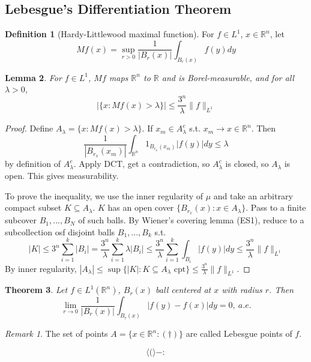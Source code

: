 \documentclass{article}
\theoremstyle{definition}
\newtheorem{defn}{Definition}[section]
\theoremstyle{remark}
\newtheorem{rem}{Remark}
\theoremstyle{plain}
\newtheorem{lem}[defn]{Lemma}
\newtheorem{thm}[defn]{Theorem}
\newcommand{\RR}{\mathbb{R}}
\begin{document}
\subsection{Lebesgue's Differentiation Theorem}
\begin{defn}[Hardy-Littlewood maximal function]
    For $f\in L^1$, $x\in\RR^n$, let $$Mf(x)=\sup_{r>0}\dfrac{1}{|B_r(x)|}\int_{B_r(x)}f(y)dy$$
\end{defn}
\begin{lem}
    For $f\in L^1$, $Mf$ maps $\RR^n$ to $\RR$ and is Borel-measurable, and for all $\lambda>0$,
    \[|\{x:Mf(x)>\lambda\}|\le\dfrac{3^n}{\lambda}\|f\|_{L^1}\]
\end{lem}
\begin{proof}
    Define $A_\lambda=\{x:Mf(x)>\lambda\}$. %
    If $x_m\in A_\lambda^c$ s.t. $x_m\to x\in\RR^n$. Then
    \[\dfrac{1}{|B_{r_x}(x_m)|}\int_{\RR^n}1_{B_{r_x}(x_m)}|f(y)|dy\le\lambda\]
    by definition of $A_\lambda^c$. Apply DCT, get a contradiction, so $A^c_\lambda$ is closed, so $A_\lambda$ is open. This gives measurability.

    To prove the inequality, we use the inner regularity of \(\mu\) and take an arbitrary compact subset $K\subseteq A_\lambda$. $K$ has an open cover $\{B_{r_x}(x):x\in A_\lambda\}$. Pass to a finite subcover $B_1,...,B_N$ of such balls. By Wiener's covering lemma (ES1), reduce to a subcollection osf disjoint balls $B_1,...,B_k$ s.t. $$|K|\le 3^n\sum_{i=1}^k|B_i|=\dfrac{3^n}{\lambda}\sum_{i=1}^k\lambda|B_i|\le \dfrac{3^n}{\lambda}\sum_{i=1}^k\int_{B_i}|f(y)|dy\le \dfrac{3^n}{\lambda}\|f\|_{L^1}$$
    By inner regularity, $|A_\lambda|\le\sup\{|K|:K\subseteq A_\lambda\text{ cpt}\}\le\frac{3^n}{\lambda}\|f\|_{L^1}$.
\end{proof}
\begin{thm}
    Let $f\in L^1(\RR^n)$, $B_r(x)$ ball centered at $x$ with radius $r$. Then
    \[\lim_{r\to 0}\dfrac{1}{|B_r(x)|}\int_{B_r(x)}|f(y)-f(x)|dy=0,\ a.e.\tag{$\dagger$}\]
\end{thm}
\begin{rem}
    The set of points $A=\{x\in\RR^n:(\dagger)\}$ are called Lebesgue points of $f$.
\end{rem}
\[\langle(\rangle-:\tag{Owen's Signature}\]
\end{document}
